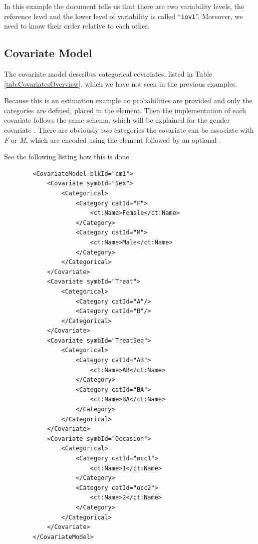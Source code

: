 In this example the \pharmml document tells us that there are two variability levels,
the reference  level and the lower level of variability is 
called ``\texttt{iov1}''\@. Moreover, we need to know their order 
relative to each other.


\subsection{Covariate Model}

The covariate model describes categorical covariates, listed in Table 
\ref{tab:CovariatesOverview}, which we have 
not seen in the previous examples. 

Because this is an estimation example no probabilities are provided and only the 
categories are defined, placed in the  element. 
Then the implementation of each covariate follows the same
schema, which will be explained for the gender covariate . 
There are obviously two categories the covariate can be associate with \textit{F} or \textit{M},
which are encoded using the  element followed by an optional
. 

See the following listing how this is done 
\lstset{language=XML}
\begin{lstlisting}
        <CovariateModel blkId="cm1">
            <Covariate symbId="Sex">
                <Categorical>
                    <Category catId="F">
                        <ct:Name>Female</ct:Name>
                    </Category>
                    <Category catId="M">
                        <ct:Name>Male</ct:Name>
                    </Category>
                </Categorical>
            </Covariate>
            <Covariate symbId="Treat">
                <Categorical>
                    <Category catId="A"/>
                    <Category catId="B"/>
                </Categorical>
            </Covariate>
            <Covariate symbId="TreatSeq">
                <Categorical>
                    <Category catId="AB">
                        <ct:Name>AB</ct:Name>
                    </Category>
                    <Category catId="BA">
                        <ct:Name>BA</ct:Name>
                    </Category>
                </Categorical>
            </Covariate>
            <Covariate symbId="Occasion">
                <Categorical>
                    <Category catId="occ1">
                        <ct:Name>1</ct:Name>
                    </Category>
                    <Category catId="occ2">
                        <ct:Name>2</ct:Name>
                    </Category>
                </Categorical>
            </Covariate>
        </CovariateModel>
\end{lstlisting}


